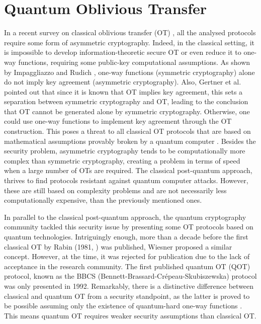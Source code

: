 


%

\chapter{Quantum Oblivious Transfer}


In a recent survey on classical oblivious transfer (OT) \cite{YAVV22}, all the analysed protocols require some form of asymmetric cryptography. Indeed, in the classical setting, it is impossible to develop information-theoretic secure OT or even reduce it to one-way functions, requiring some public-key computational assumptions. As shown by Impaggliazzo and Rudich \cite{IR89}, one-way functions (symmetric cryptography) alone do not imply key agreement (asymmetric cryptography). Also, Gertner et al. \cite{GKMRV00} pointed out that since it is known that OT implies key agreement, this sets a separation between symmetric cryptography and OT, leading to the conclusion that OT cannot be generated alone by symmetric cryptography. Otherwise, one could use one-way functions to implement key agreement through the OT construction. This poses a threat to all classical OT protocols \cite{EGL85, NP01, CO15} that are based on mathematical assumptions provably broken by a quantum computer \cite{Sho95}. Besides the security problem, asymmetric cryptography tends to be computationally more complex than symmetric cryptography, creating a problem in terms of speed when a large number of OTs are required. The classical post-quantum approach, thrives to find protocols resistant against quantum computer attacks. However, these are still based on complexity problems and are not necessarily less computationally expensive, than the previously mentioned ones. 

In parallel to the classical post-quantum approach, the quantum cryptography community tackled this security issue by presenting some OT protocols based on quantum technologies. Intriguingly enough, more than a decade before the first classical OT by Rabin (1981, \cite{Rabin81}) was published, Wiesner proposed a similar concept. However, at the time, it was rejected for publication due to the lack of acceptance in the research community. The first published quantum OT (QOT) protocol, known as the BBCS (Bennett-Brassard-Cr{\'e}peau-Skubiszewska) protocol \cite{BBCS92} was only presented in 1992. Remarkably, there is a distinctive difference between classical and quantum OT from a security standpoint, as the latter is proved to be possible assuming only the existence of quantum-hard one-way functions \cite{GLSV21, BCKM21}. This means quantum OT requires weaker security assumptions than classical OT.

